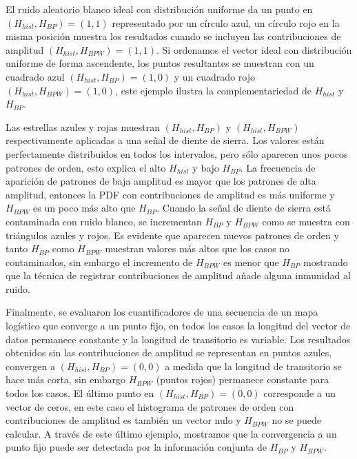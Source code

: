 El ruido aleatorio blanco ideal con distribución uniforme da un punto en $(H_{hist}, H_{BP}) = (1, 1)$ representado por un círculo azul, un círculo rojo en la misma posición muestra los resultados cuando se incluyen las contribuciones de amplitud $(H_{hist}, H_{BPW}) = (1, 1)$.
Si ordenamos el vector ideal con distribución uniforme de forma ascendente, los puntos resultantes se muestran con un cuadrado azul $(H_{hist}, H_{BP}) = (1, 0)$ y un cuadrado rojo $(H_{hist}, H_{BPW}) = (1, 0)$, este ejemplo ilustra la complementariedad de $H_{hist}$ y $H_{BP}$.

Las estrellas azules y rojas muestran $(H_{hist}, H_{BP})$ y $ (H_{hist}, H_{BPW})$ respectivamente aplicadas a una señal de diente de sierra.
Los valores están perfectamente distribuidos en todos los intervalos, pero sólo aparecen unos pocos patrones de orden, esto explica el alto $H_ {hist}$ y bajo $H_ {BP}$.
La frecuencia de aparición de patrones de baja amplitud es mayor que los patrones de alta amplitud, entonces la PDF con contribuciones de amplitud es más uniforme y $H_ {BPW}$ es un poco más alto que $H_ {BP}$.
Cuando la señal de diente de sierra está contaminada con ruido blanco, se incrementan $H_ {BP}$ y $H_ {BPW}$ como se muestra con triángulos azules y rojos.
Es evidente que aparecen nuevos patrones de orden y tanto $H_{BP}$ como $H_{BPW}$ muestran valores más altos que los casos no contaminados, sin embargo el incremento de $H_{BPW}$ es menor que $H_{BP}$ mostrando que la técnica de registrar contribuciones de amplitud añade alguna inmunidad al ruido.

Finalmente, se evaluaron los cuantificadores de una secuencia de un mapa logístico que converge a un punto fijo, en todos los casos la longitud del vector de datos permanece constante y la longitud de transitorio es variable.
Los resultados obtenidos sin las contribuciones de amplitud se representan en puntos azules, convergen a $(H_{hist}, H_{BP}) = (0, 0)$ a medida que la longitud de transitorio se hace más corta, sin embargo $H_{BPW}$ (puntos rojos) permanece constante para todos los casos.
El último punto en $(H_{hist}, H_{BP}) = (0, 0)$ corresponde a un vector de ceros, en este caso el histograma de patrones de orden con contribuciones de amplitud es también un vector nulo y $H_{BPW}$ no se puede calcular.
A través de este último ejemplo, mostramos que la convergencia a un punto fijo puede ser detectada por la información conjunta de $H_{BP}$ y $H_{BPW}$.


